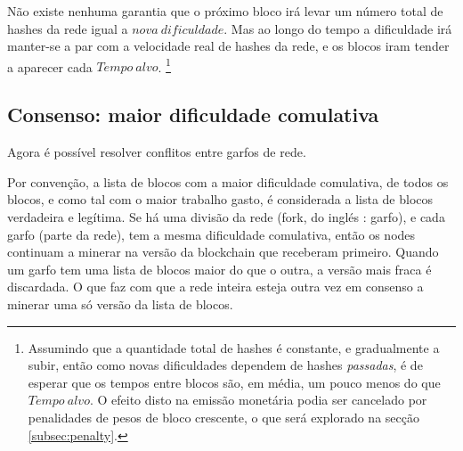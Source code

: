 Não existe nenhuma garantia que o próximo bloco irá levar um número total de hashes da rede igual a $\mathit{nova\ dificuldade}$. Mas ao longo do tempo a dificuldade irá manter-se a par com a velocidade real de hashes da rede, e os blocos iram tender a aparecer cada $\mathit{Tempo\ alvo}$.   
\footnote{Assumindo que a quantidade total de hashes é constante, e gradualmente a subir, então como novas dificuldades dependem de hashes {\em passadas}, é de esperar que os tempos entre blocos são, em média, um pouco menos do que $\mathit{Tempo\ alvo}$.
O efeito disto na emissão monetária podia ser cancelado por penalidades de pesos de bloco crescente, o que será explorado na secção \ref{subsec:penalty}.}   


\subsection{Consenso: maior dificuldade comulativa}
Agora é possível resolver conflitos entre garfos de rede.


Por convenção, a lista de blocos com a maior dificuldade comulativa, de todos os blocos, e como tal com o maior trabalho gasto, é considerada a lista de blocos verdadeira e legítima. Se há uma divisão da rede (fork, do inglés : garfo), e cada garfo (parte da rede), tem a mesma dificuldade comulativa, então os nodes continuam a minerar na versão da blockchain que receberam primeiro. Quando um garfo tem uma lista de blocos maior do que o outra, a versão mais fraca é discardada. O que faz com que a rede inteira esteja outra vez em consenso a minerar uma só versão da lista de blocos.


